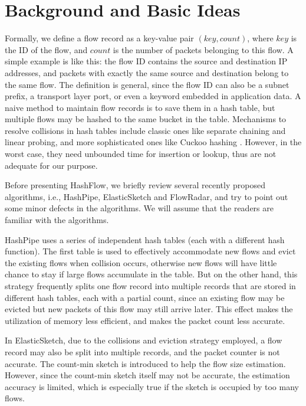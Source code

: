 \section{Background and Basic Ideas}
\label{section:background}
Formally, we define a flow record as a key-value pair $(key, count)$, 
where $key$ is the ID of the flow, and $count$ is the number of packets belonging to this flow. 
A simple example is like this: the flow ID contains the source and destination IP addresses, 
and packets with exactly the same source and destination belong to the same flow. 
The definition is general, since the flow ID can also be a subnet prefix, a transport layer port, 
or even a keyword embedded in application data. A naive method to maintain flow records is to 
save them in a hash table, but multiple flows may be hashed to the same bucket in the table. 
Mechanisms to resolve collisions in hash tables include classic ones like separate chaining 
and linear probing, and more sophisticated ones like Cuckoo hashing \cite{pagh_cuckoo_2004}.
However, in the worst case, they need unbounded time for insertion or lookup, thus are not 
adequate for our purpose. 

Before presenting HashFlow, we briefly review several recently proposed algorithms,
i.e., HashPipe\cite{sivaraman_heavy-hitter_2017}, ElasticSketch\cite{yang_elastic_2018} and FlowRadar\cite{li_flowradar:_2016}, and try to point out some minor defects in the algorithms. We will assume that the readers are familiar with the algorithms.

HashPipe\cite{sivaraman_heavy-hitter_2017} uses a series of independent hash tables (each with a different hash function). The first table is used to effectively accommodate new flows and evict the existing flows when collision occurs, otherwise new flows will have little chance to stay if large flows accumulate in the table. But on the other hand, this strategy frequently 
splits one flow record into multiple records that are stored in different hash tables, each with a partial count, 
since an existing flow may be evicted but new packets of this flow may still arrive later. 
This effect makes the utilization of memory less efficient, and makes the packet count less accurate. 

In ElasticSketch\cite{yang_elastic_2018}, due to the collisions and eviction strategy employed, a flow record may also be split 
into multiple records, and the packet counter is not accurate. The count-min sketch is introduced to help the flow size 
estimation. However, since the count-min sketch itself may not be accurate, the estimation accuracy is limited,  
which is especially true if the sketch is occupied by too many flows. 


